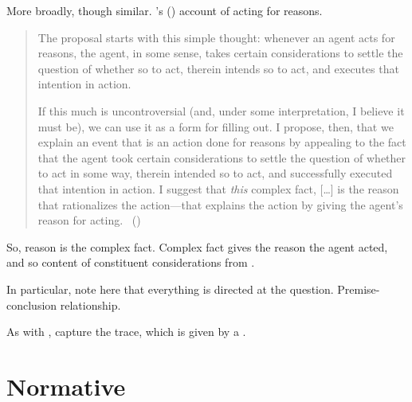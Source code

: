 \begin{note}
  More broadly, though similar.
  \citeauthor{Hieronymi:2011aa}'s (\citeyear{Hieronymi:2011aa}) account of acting for reasons.

  \begin{quote}
    The proposal starts with this simple thought: whenever an agent acts for reasons, the agent, in some sense, takes certain considerations to settle the question of whether so to act, therein intends so to act, and executes that intention in action.

    If this much is uncontroversial (and, under some interpretation, I believe it must be), we can use it as a form for filling out.
    I propose, then, that we explain an event that is an action done for reasons by appealing to the fact that the agent took certain considerations to settle the question of whether to act in some way, therein intended so to act, and successfully executed that intention in action.
    I suggest that \emph{this} complex fact, [\dots] is the reason that rationalizes the action---that explains the action by giving the agent's reason for acting.%
    \mbox{ }\hfill\mbox{(\citeyear[431]{Hieronymi:2011aa})}
  \end{quote}

  So, reason is the complex fact.
  Complex fact gives the reason the agent acted, and so content of constituent considerations from \agpe{}.

  In particular, note here that everything is directed at the question.
  Premise-conclusion relationship.

  As with \citeauthor{Harman:1973ww}, capture the trace, which is given by a \wit{}.
\end{note}

\section{Normative}
\label{cha:lit:normative}

\subsection*{\textcite{Lord:2018aa}}

